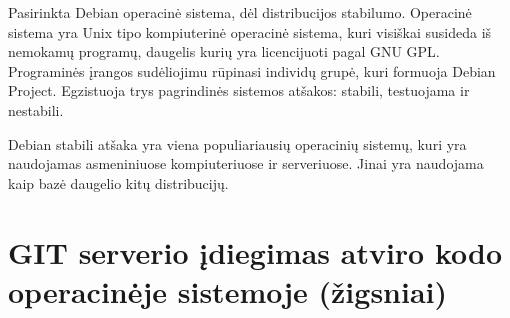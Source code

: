 \documentclass[11pt, a4paper, lithuanian]{article}
\begin{document}
    Pasirinkta Debian operacinė sistema, dėl distribucijos stabilumo. 
    Operacinė sistema yra Unix tipo kompiuterinė operacinė sistema, kuri visiškai susideda iš nemokamų programų, daugelis kurių yra licencijuoti pagal GNU GPL.
    Programinės įrangos sudėliojimu rūpinasi individų grupė, kuri formuoja Debian Project.
    Egzistuoja trys pagrindinės sistemos atšakos: stabili, testuojama ir nestabili.

    Debian stabili atšaka yra viena populiariausių operacinių sistemų, kuri yra naudojamas asmeniniuose kompiuteriuose ir serveriuose.
    Jinai yra naudojama kaip bazė daugelio kitų distribucijų.

    \section{GIT serverio įdiegimas atviro kodo operacinėje sistemoje (žigsniai)}
\end{document}

